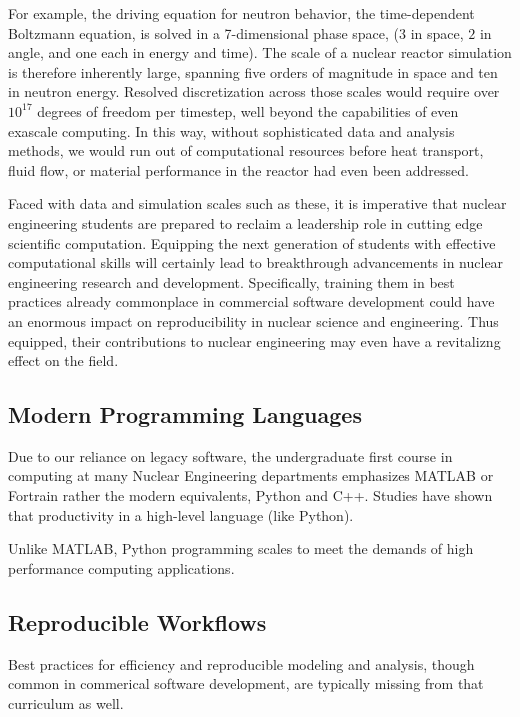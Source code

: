 \documentclass{anstrans}
\begin{document}
For example, the driving equation for neutron behavior, the time-dependent
Boltzmann equation, is solved in a 7-dimensional phase space, ($3$ in space, $2$
in angle, and one each in energy and time). The scale of a nuclear reactor
simulation is therefore inherently large, spanning five orders of magnitude in space and
ten in neutron energy. Resolved discretization across those scales would require
over $10^{17}$ degrees of freedom per timestep, well beyond the
capabilities of even exascale computing. In this way, without sophisticated
data and analysis methods, we would run out of computational resources before
heat transport, fluid flow, or material performance in the reactor had even
been addressed.

Faced with data and simulation scales such as these, it is imperative
that nuclear engineering students are prepared to reclaim a leadership role in
cutting edge scientific computation. Equipping the next generation of
students with effective computational skills will certainly lead to breakthrough
advancements in nuclear engineering research and development.
Specifically, training them in best practices already commonplace in commercial
software development could have an enormous impact on reproducibility in
nuclear science and engineering. Thus equipped, their contributions to nuclear
engineering may even have a revitalizng effect on the field.

\subsection{Modern Programming Languages}

Due to our reliance on legacy software, the undergraduate first course in
computing at many Nuclear Engineering departments emphasizes MATLAB or Fortrain
rather the modern equivalents, Python and C++. Studies have shown that
productivity in a high-level language (like Python).

Unlike MATLAB, Python programming scales to meet the demands of high performance computing applications.

\subsection{Reproducible Workflows}

Best practices for efficiency
and reproducible modeling and analysis, though common in commerical software
development, are typically missing from that curriculum as well.
\end{document}
